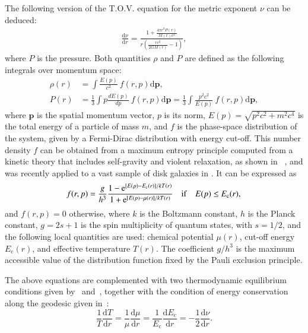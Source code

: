 \documentclass[twocolumn]{aa}
\begin{document}
The following version of the T.O.V. equation for the metric exponent $\nu$ can be deduced:
\begin{align}
   \label{tov}
    \frac{\mathrm{d}\nu}{\mathrm{d}r}= \frac{1+ \frac{\displaystyle 4\pi r^3 P(r)}{\displaystyle M(r)c^2}}{r\left(\frac{\displaystyle rc^2}{\displaystyle 2GM(r)} -1\right)},
\end{align}
where $P$ is the pressure.
Both quantities $\rho$ and $P$ are defined as the following integrals over momentum space:
\begin{align}
     \label{dens_press}
      \rho(r)&=\int \frac{E(p)}{c^2}~f(r,p)\mathrm{d}\boldsymbol{p},\\
      P(r)&=\frac{1}{3}\int p\frac{dE(p)}{dp}~f(r,p)\mathrm{d}\boldsymbol{p}=
                \frac{1}{3}\int \frac{p^2c^2}{E(p)}~f(r,p)\mathrm{d}\boldsymbol{p},
\end{align}
where $\boldsymbol{p}$ is the spatial momentum  vector, $p$ is its norm, $E(p)=\sqrt{p^2c^2+m^2c^4}$ is the total energy of a particle of mass $m$, and $f$ is the phase-space distribution of the system, given by a Fermi-Dirac distribution with energy cut-off. This number density $f$ can be obtained from a maximum entropy principle computed from a kinetic theory that includes self-gravity and violent relaxation, as shown in \citealp{2004PhyA..332...89C}~\citep[for a review see also][]{2022PhyA..60628089C}, and was recently applied to a vast sample of disk galaxies in \cite{2023ApJ...945....1K}. It can be expressed as
\begin{equation}
f(r,p)=
    \frac{g}{h^3}
      \frac{1-\mathrm{e}^{[E(p)-E_\mathrm{c}(r)]/kT(r)}}
      {1+\mathrm{e}^{[E(p)-\mu(r)]/kT(r)}}\quad\mathrm{if}\quad E(p) \leq E_\mathrm{c}(r),\\
\end{equation}
and $f(r,p)=0$ otherwise,
where $k$ is the Boltzmann constant, $h$ is the Planck constant, $g=2s+1$ is the spin multiplicity of quantum states, with $s=1/2$, and the following local quantities are used: chemical potential $\mu(r)$, cut-off energy $E_\mathrm{c}(r)$,  and effective temperature $T(r)$.
The coefficient $g/h^3$ is the maximum accessible value of the distribution function fixed by the Pauli exclusion principle.

The above equations are complemented with two thermodynamic equilibrium conditions given
by~\citet{PhysRev.35.904} and~\citet{RevModPhys.21.531}, together with the condition of energy conservation
along the geodesic given in~\citet{1989A&A...221....4M}:
\begin{equation}
    \label{tke}
   \frac{1}{T}\frac{\mathrm{d}T}{\mathrm{d}r}=\frac{1}{\mu}\frac{\mathrm{d}\mu}{\mathrm{d}r}=
   \frac{1}{E_\mathrm{c}}\frac{\mathrm{d} E_\mathrm{c}}{\mathrm{d}r}=-\frac{1}{2}\frac{\mathrm{d}\nu}{\mathrm{d}r}.
\end{equation}
\end{document}
